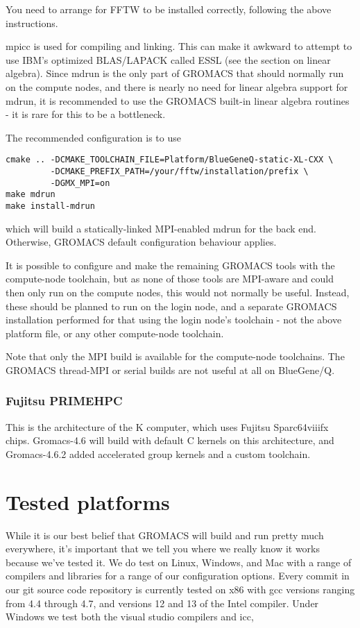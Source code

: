 \documentclass{article}[12pt,a4paper,twoside]
\newcommand{\gromacs}{GROMACS}
\newcommand{\mpi}{MPI}
\begin{document}
You need to arrange for FFTW to be installed correctly, following the
above instructions.

mpicc is used for compiling and linking. This can make it awkward to
attempt to use IBM's optimized BLAS/LAPACK called ESSL (see the
section on linear algebra). Since mdrun is the only part of \gromacs{}
that should normally run on the compute nodes, and there is nearly no
need for linear algebra support for mdrun, it is recommended to use
the \gromacs{} built-in linear algebra routines - it is rare for this
to be a bottleneck.

The recommended configuration is to use
\begin{verbatim}
cmake .. -DCMAKE_TOOLCHAIN_FILE=Platform/BlueGeneQ-static-XL-CXX \
         -DCMAKE_PREFIX_PATH=/your/fftw/installation/prefix \
         -DGMX_MPI=on
make mdrun
make install-mdrun
\end{verbatim}
which will build a statically-linked MPI-enabled mdrun for the back
end. Otherwise, GROMACS default configuration behaviour applies.

It is possible to configure and make the remaining \gromacs{} tools
with the compute-node toolchain, but as none of those tools are
\mpi{}-aware and could then only run on the compute nodes, this
would not normally be useful. Instead, these should be planned
to run on the login node, and a separate \gromacs{} installation
performed for that using the login node's toolchain - not the
above platform file, or any other compute-node toolchain.

Note that only the MPI build is available for the compute-node
toolchains. The GROMACS thread-MPI or serial builds are not useful at
all on BlueGene/Q.

\subsubsection{Fujitsu PRIMEHPC}

This is the architecture of the K computer, which uses Fujitsu Sparc64viiifx 
chips. Gromacs-4.6 will build with default C kernels on this architecture,
and Gromacs-4.6.2 added accelerated group kernels and a custom toolchain.

\section{Tested platforms}

While it is our best belief that \gromacs{} will build and run pretty
much everywhere, it's important that we tell you where we really know
it works because we've tested it. We do test on Linux, Windows, and
Mac with a range of compilers and libraries for a range of our
configuration options. Every commit in our git source code
repository is currently tested on x86 with gcc versions ranging
from 4.4 through 4.7, and versions 12 and 13 of the Intel compiler.
Under Windows we test both the visual studio compilers and icc,
\end{document}
